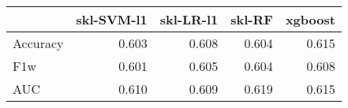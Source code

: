\begin{tabular}{lrrrr}
\toprule
{} &  skl-SVM-l1 &  skl-LR-l1 &  skl-RF &  xgboost \\
\midrule
Accuracy &       0.603 &      0.608 &   0.604 &    0.615 \\
F1w      &       0.601 &      0.605 &   0.604 &    0.608 \\
AUC      &       0.610 &      0.609 &   0.619 &    0.615 \\
\bottomrule
\end{tabular}
